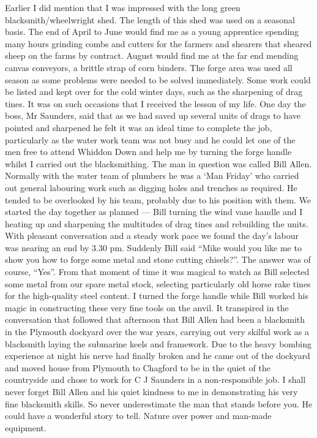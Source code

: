 
Earlier I did mention that I was impressed with the long green
blacksmith/wheelwright shed. The length of this shed was used on a seasonal
basis. The end of April to June would find me as a young apprentice spending
many hours grinding combs and cutters for the farmers and shearers that sheared
sheep on the farms by contract. August would find me at the far end mending
canvas conveyors, a brittle strap of corn binders. The forge area was used all
season as some problems were needed to be solved immediately. Some work could
be listed and kept over for the cold winter days, such as the sharpening of
drag tines. It was on such occasions that I received the lesson of my life. One
day the boss, Mr Saunders, said that as we had saved up several units of drags
to have pointed and sharpened he felt it was an ideal time to complete the job,
particularly as the water work team was not busy and he could let one of the
men free to attend Whiddon Down and help me by turning the forge handle whilst
I carried out the blacksmithing. The man in question was called Bill Allen.
Normally with the water team of plumbers he was a `Man Friday' who carried out
general labouring work such as digging holes and trenches as required. He
tended to be overlooked by his team, probably due to his position with them. We
started the day together as planned --- Bill turning the wind vane handle and I
heating up and sharpening the multitudes of drag tines and rebuilding the
units. With pleasant conversation and a steady work pace we found the day's
labour was nearing an end by 3.30 pm. Suddenly Bill said ``Mike would you like
me to show you how to forge some metal and stone cutting chisels?''. The answer
was of course, ``Yes''. From that moment of time it was magical to watch as
Bill selected some metal from our spare metal stock, selecting particularly old
horse rake tines for the high-quality steel content. I turned the forge handle
while Bill worked his magic in constructing these very fine tools on the anvil.
It transpired in the conversation that followed that afternoon that Bill Allen
had been a blacksmith in the Plymouth dockyard over the war years, carrying out
very skilful work as a blacksmith laying the submarine keels and framework. Due
to the heavy bombing experience at night his nerve had finally broken and he
came out of the dockyard and moved house from Plymouth to Chagford to be in the
quiet of the countryside and chose to work for C J  Saunders in a
non-responsible job. I shall never forget Bill Allen and his quiet kindness to
me in demonstrating his very fine blacksmith skills. So never underestimate the
man that stands before you. He could have a wonderful story to tell. Nature
over power and man-made equipment.

